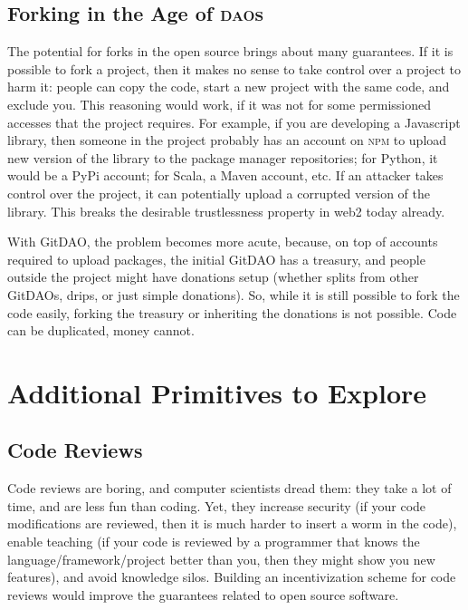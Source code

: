 \subsection{Forking in the Age of \textsc{dao}s}

The potential for forks in the open source brings about many guarantees.
If it is possible to fork a project, then it makes no sense to take control over a project to harm it: people can copy the code, start a new project with the same code, and exclude you.
This reasoning would work, if it was not for some permissioned accesses that the project requires.
For example, if you are developing a Javascript library, then someone in the project probably has an account on \textsc{npm} to upload new version of the library to the package manager repositories; for Python, it would be a PyPi account; for Scala, a Maven account, etc.
If an attacker takes control over the project, it can potentially upload a corrupted version of the library.
This breaks the desirable trustlessness property in web2 today already.

With GitDAO, the problem becomes more acute, because, on top of accounts required to upload packages, the initial GitDAO has a treasury, and people outside the project might have donations setup (whether splits from other GitDAOs, drips, or just simple donations).
So, while it is still possible to fork the code easily, forking the treasury or inheriting the donations is not possible.
Code can be duplicated, money cannot.

\section{Additional Primitives to Explore}

\subsection{Code Reviews}

Code reviews are boring, and computer scientists dread them: they take a lot of time, and are less fun than coding.
Yet, they increase security (if your code modifications are reviewed, then it is much harder to insert a worm in the code), enable teaching (if your code is reviewed by a programmer that knows the language/framework/project better than you, then they might show you new features), and avoid knowledge silos.
Building an incentivization scheme for code reviews would improve the guarantees related to open source software.

